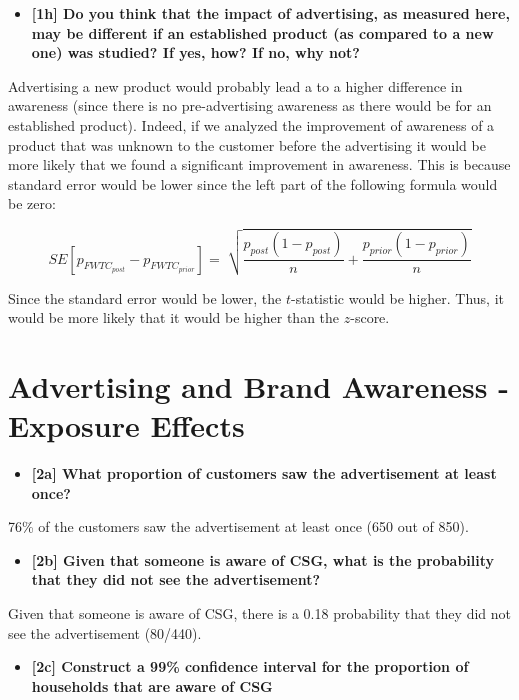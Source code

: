 \documentclass[10pt, oneside,spanish]{article}
\begin{document}
\begin{itemize}
\item \textbf{ [1h]  Do you think that the impact of advertising, as measured here, may be different if an established product (as compared to a new one) was studied? If yes, how? If no, why not?   }
\end{itemize}

Advertising a new product would probably lead a to a higher difference in awareness (since there is no pre-advertising awareness as there would be for an established product). Indeed, if we analyzed the improvement of awareness of a product that was unknown to the customer before the advertising it would be more likely that we found a significant improvement in awareness. This is because standard error would be lower since the left part of the following formula would be zero:

$$ SE[p_{FWTC_{post}} - p_{FWTC_{prior}}] = \sqrt[]{\frac{p_{post} (1 - p_{post})}{n} + \frac{p_{prior} (1 - p_{prior})}{n}} $$

Since the standard error would be lower, the $t$-statistic would be higher. Thus, it would be more likely that it would be higher than the $z$-score. 


\section{Advertising and Brand Awareness - Exposure Effects}


\begin{itemize}
\item \textbf{ [2a]  What proportion of customers saw the advertisement at least once?   }
\end{itemize}

76\% of the customers saw the advertisement at least once (650 out of 850).



\begin{itemize}
\item \textbf{ [2b]  Given that someone is aware of CSG, what is the probability that they did not see the advertisement?   }
\end{itemize}

Given that someone is aware of CSG, there is a 0.18 probability that they did not see the advertisement (80/440). 



\begin{itemize}
\item \textbf{ [2c]   Construct a 99\% confidence interval for the proportion of households that are aware of CSG }
\end{itemize}
\end{document}
